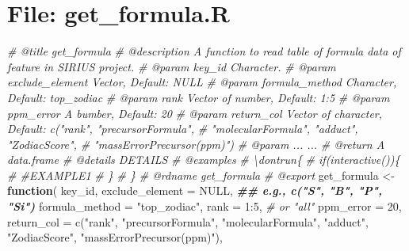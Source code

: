 \documentclass[
]{article}
\newenvironment{Shaded}{\begin{snugshade}}{\end{snugshade}}
\newcommand{\AttributeTok}[1]{\textcolor[rgb]{0.77,0.63,0.00}{#1}}
\newcommand{\CommentTok}[1]{\textcolor[rgb]{0.56,0.35,0.01}{\textit{#1}}}
\newcommand{\ConstantTok}[1]{\textcolor[rgb]{0.00,0.00,0.00}{#1}}
\newcommand{\ControlFlowTok}[1]{\textcolor[rgb]{0.13,0.29,0.53}{\textbf{#1}}}
\newcommand{\DecValTok}[1]{\textcolor[rgb]{0.00,0.00,0.81}{#1}}
\newcommand{\DocumentationTok}[1]{\textcolor[rgb]{0.56,0.35,0.01}{\textbf{\textit{#1}}}}
\newcommand{\FunctionTok}[1]{\textcolor[rgb]{0.00,0.00,0.00}{#1}}
\newcommand{\NormalTok}[1]{#1}
\newcommand{\OtherTok}[1]{\textcolor[rgb]{0.56,0.35,0.01}{#1}}
\newcommand{\SpecialCharTok}[1]{\textcolor[rgb]{0.00,0.00,0.00}{#1}}
\newcommand{\StringTok}[1]{\textcolor[rgb]{0.31,0.60,0.02}{#1}}
\begin{document}
\hypertarget{file-get_formula.r}{%
\section{File: get\_formula.R}\label{file-get_formula.r}}

\begin{Shaded}
\begin{Highlighting}[]
\CommentTok{\#\textquotesingle{} @title get\_formula}
\CommentTok{\#\textquotesingle{} @description A function to read table of formula data of feature in SIRIUS project.}
\CommentTok{\#\textquotesingle{} @param key\_id Character.}
\CommentTok{\#\textquotesingle{} @param exclude\_element Vector, Default: NULL}
\CommentTok{\#\textquotesingle{} @param formula\_method Character, Default: \textquotesingle{}top\_zodiac\textquotesingle{}}
\CommentTok{\#\textquotesingle{} @param rank Vector of number, Default: 1:5}
\CommentTok{\#\textquotesingle{} @param ppm\_error A bumber, Default: 20}
\CommentTok{\#\textquotesingle{} @param return\_col Vector of character, Default: c("rank", "precursorFormula",}
\CommentTok{\# \textquotesingle{}   "molecularFormula", "adduct", "ZodiacScore", }
\CommentTok{\#\textquotesingle{}    "massErrorPrecursor(ppm)")}
\CommentTok{\#\textquotesingle{} @param ... ...}
\CommentTok{\#\textquotesingle{} @return A data.frame}
\CommentTok{\#\textquotesingle{} @details DETAILS}
\CommentTok{\#\textquotesingle{} @examples }
\CommentTok{\#\textquotesingle{} \textbackslash{}dontrun\{}
\CommentTok{\#\textquotesingle{} if(interactive())\{}
\CommentTok{\#\textquotesingle{}  \#EXAMPLE1}
\CommentTok{\#\textquotesingle{}  \}}
\CommentTok{\#\textquotesingle{} \}}
\CommentTok{\#\textquotesingle{} @rdname get\_formula}
\CommentTok{\#\textquotesingle{} @export }
\NormalTok{get\_formula }\OtherTok{\textless{}{-}}
  \ControlFlowTok{function}\NormalTok{(}
\NormalTok{           key\_id,}
           \AttributeTok{exclude\_element =} \ConstantTok{NULL}\NormalTok{, }\DocumentationTok{\#\# e.g., c("S", "B", "P", "Si")}
           \AttributeTok{formula\_method =} \StringTok{"top\_zodiac"}\NormalTok{,}
           \AttributeTok{rank =} \DecValTok{1}\SpecialCharTok{:}\DecValTok{5}\NormalTok{, }\CommentTok{\# or "all"}
           \AttributeTok{ppm\_error =} \DecValTok{20}\NormalTok{,}
           \AttributeTok{return\_col =} \FunctionTok{c}\NormalTok{(}\StringTok{"rank"}\NormalTok{, }\StringTok{"precursorFormula"}\NormalTok{, }\StringTok{"molecularFormula"}\NormalTok{,}
                        \StringTok{"adduct"}\NormalTok{, }\StringTok{"ZodiacScore"}\NormalTok{, }\StringTok{"massErrorPrecursor(ppm)"}\NormalTok{),}

\end{Highlighting}
\end{Shaded}
\end{document}
